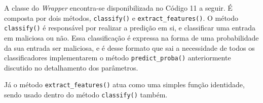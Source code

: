 A classe do \textit{Wrapper} encontra-se disponibilizada no Código 11 a seguir. É composta por dois métodos, \verb+classify()+ e \verb+extract_features()+. O método \verb+classify()+ é responsável por realizar a predição em si, e classificar uma entrada em maliciosa ou não. Essa classificação é expressa na forma de uma probabilidade da sua entrada ser maliciosa, e é desse formato que sai a necessidade de todos os classificadores implementarem o método \verb+predict_proba()+ anteriormente discutido no detalhamento dos parâmetros. 

Já o método \verb+extract_features()+ atua como uma simples função identidade, sendo usado dentro do método \verb+classify()+ também.

\label{sec:codigos:modelos}
\bigskip



